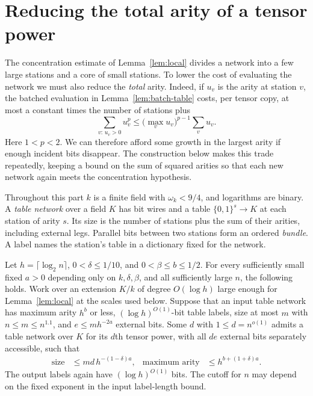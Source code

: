 \section{Reducing the total arity of a tensor power}\label{sec:rounds}

The concentration estimate of Lemma~\ref{lem:local} divides a network
into a few large stations and a core of small stations. To lower the cost
of evaluating the network we must also reduce the \emph{total} arity.
Indeed, if $u_v$ is the arity at station $v$, the batched evaluation in
Lemma~\ref{lem:batch-table} costs, per tensor copy, at most a constant
times the number of stations plus
\[
       \sum_{v:\,u_v>0}u_v^p
           \le \bigl(\max_v u_v\bigr)^{p-1}\sum_v u_v .
\]
Here $1<p<2$. We can therefore afford some growth in the largest arity
if enough incident bits disappear. The construction below makes this
trade repeatedly, keeping a bound on the sum of squared arities so that
each new network again meets the concentration hypothesis.

Throughout this part $k$ is a finite field with $\omega_k<9/4$, and
logarithms are binary. A \emph{table network} over a field $K$ has bit
wires and a table $\{0,1\}^{s}\to K$ at each station of arity $s$. Its
size is the number of stations plus the sum of their arities, including
external legs. Parallel bits between two stations form an ordered
\emph{bundle}. A label names the station's table in a dictionary fixed
for the network.

\begin{lemma}\label{lem:macro}
Let $h=\lceil\log_2 n\rceil$, $0<\delta\le 1/10$, and
$0<\beta\le b\le 1/2$. For every sufficiently small fixed $a>0$
depending only on $k,\delta,\beta$, and all sufficiently large $n$, the
following holds. Work over an extension $K/k$ of degree $O(\log h)$
large enough for Lemma~\ref{lem:local} at the scales used below.
Suppose that an input table network has maximum arity $h^b$ or less,
$(\log h)^{O(1)}$-bit table labels, size at most $m$ with
$n\le m\le n^{1.1}$, and $e\le m h^{-2a}$ external bits. Some
$d$ with $1\le d=n^{o(1)}$ admits a table network over $K$ for its
$d$th tensor power, with all $de$ external bits separately accessible,
such that
\[
 \begin{aligned}
 \text{size}&\le md\,h^{-(1-\delta)a},&
 \text{maximum arity}&\le h^{b+(1+\delta)a}.
 \end{aligned}
\]
The output labels again have $(\log h)^{O(1)}$ bits. The cutoff for $n$
may depend on the fixed exponent in the input label-length bound.
\end{lemma}

